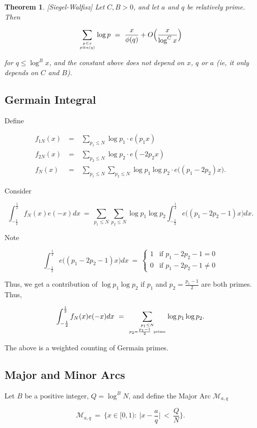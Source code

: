 \documentclass[12pt,letterpaper]{report}
\newcommand\be{\begin{equation}}
\newcommand\ee{\end{equation}}
\newcommand\bea{\begin{eqnarray}}
\newcommand\eea{\end{eqnarray}}
\newcommand{\foh}{\frac{1}{2}}  %
\newtheorem{thm}{Theorem}[section]
\newcommand{\twocase}[5]{#1 \begin{cases} #2 & \text{#3}\\ #4
&\text{#5} \end{cases}   }
\begin{document}
\begin{thm}\label{thmsiegelw}[Siegel-Walfisz] Let $C, B > 0$,
and let $a$ and $q$ be relatively prime. Then

\be \sum_{ {p \le x} \atop {p \equiv a (q)} } \log p \ = \
\frac{x}{\phi(q)} + O\Big( \frac{x}{\log^C x} \Big) \ee

for $q \le \log^B x$, and the constant above does not depend on
$x$, $q$ or $a$ (ie, it only depends on $C$ and $B$).
\end{thm}


\subsection{Germain Integral}

Define

\bea f_{1N}(x) & \ = \ & \sum_{p_1 \le N} \log p_1 \cdot e(p_1x) \nonumber\\
f_{2N}(x) & \ = \ & \sum_{p_2 \le N} \log p_2 \cdot e(-2p_2 x)
\nonumber\\ f_N(x) & \ = \ & \sum_{p_1 \le N} \sum_{p_2 \le N}
\log p_1 \log p_2 \cdot e\Big( (p_1 - 2p_2)x \Big). \eea


Consider

\be \int_{-\foh}^\foh f_N(x) e(-x)dx \ = \ \sum_{p_1 \le N}
\sum_{p_2 \le N} \log p_1 \log p_2 \int_{-\foh}^\foh e\Big( (p_1 -
2p_2 - 1)x \Big)dx. \ee


Note

\be \twocase{\int_{-\foh}^\foh e\Big( (p_1 - 2p_2 - 1)x \Big)dx \
= \ }{1}{if $p_1 - 2p_2 - 1 = 0$}{0}{if $p_1 - 2p_2 - 1 \neq 0$}
\ee

Thus, we get a contribution of $\log p_1 \log p_2$ if $p_1$ and $
p_2 = \frac{p_1 - 1}{2}$ are both primes. Thus,

\be \int_{-\foh}^\foh f_N(x) e(-x)dx \ = \ \sum_{p_1 \le N \atop
p_2 = \frac{p_1-1}{2} \ \text{prime} } \log p_1 \log p_2. \ee

The above is a weighted counting of Germain primes.



\subsection{Major and Minor Arcs}

Let $B$ be a positive integer, $Q = \log^B N$, and define the
Major Arc $\mathcal{M}_{a,q}$

\be \mathcal{M}_{a,q} \ = \ \Big\{ x \in [0,1): \ \Big|x -
\frac{a}{q} \Big| \ < \ \frac{Q}{N} \Big\}. \ee
\end{document}
